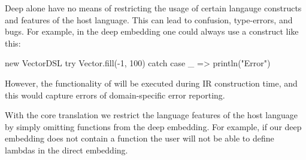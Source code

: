 \documentclass[paper.tex]{subfiles}
\begin{document}
Deep \edsls{} alone have no means of restricting the usage of certain langauge constructs and features of the host language. This can lead to confusion, type-errors, and bugs. For example, in the deep embedding one could always use a  construct like this:
\lstset{mathescape=false}
\begin{listingtiny}
  new VectorDSL {
    try Vector.fill(-1,  100) catch { case _ => println("Error") }
  }
\end{listingtiny}
\lstset{mathescape=true}
%
However, the functionality of  will be executed during IR construction time, and this would capture errors of domain-specific error reporting. 

With the core translation we restrict the language features of the host language by simply omitting functions from the deep embedding. For example, if our deep embedding does not contain a function  the user will not be able to define lambdas in the direct embedding. 
\end{document}
